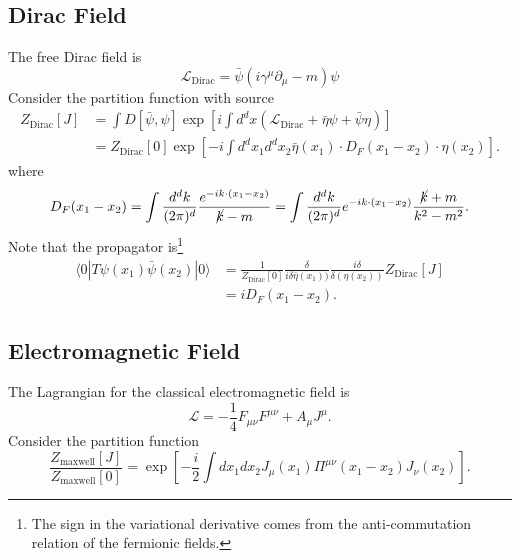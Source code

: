 \subsection{Dirac Field}
The free Dirac field is
\begin{equation}
	\mathcal{L}_{\mathrm{Dirac}}
	= \bar\psi \left(i\gamma^\mu \partial_\mu - m\right)\psi
\end{equation}
Consider the partition function with source
\begin{equation}
\begin{aligned}
	Z_{\mathrm{Dirac}}[J]
	&= \int D[\bar\psi,\psi] \exp\left[i\int d^dx \left(\mathcal{L}_{\mathrm{Dirac}}+\bar{\eta}\psi + \bar\psi\eta \right) \right] \\
	&= Z_{\mathrm{Dirac}}[0] \exp\left[-i\int d^dx_1 d^d x_2 \bar{\eta}(x_1)\cdot D_F(x_1-x_2)\cdot \eta(x_2) \right].
\end{aligned}
\end{equation}
where
\begin{equation}
	D_F(x_1-x_2) = \int \frac{d^d k}{(2\pi)^d} \frac{e^{-i k \cdot (x_1-x_2)}}{\cancel{k}-m}
	= \int \frac{d^d k}{(2\pi)^d} e^{-i k \cdot (x_1-x_2)} \frac{\cancel{k}+m}{k^2-m^2}.
\end{equation}
Note that the propagator is\footnote{The sign in the variational derivative comes from the anti-commutation relation of the fermionic fields.}
\begin{equation}
\begin{aligned}
	\langle 0| T \psi(x_1) \bar\psi(x_2) |0\rangle
	&= \frac{1}{Z_{\mathrm{Dirac}}[0]}\frac{\delta}{i\delta \bar{\eta}(x_1))}\frac{i\delta}{\delta(\eta(x_2))} Z_{\mathrm{Dirac}}[J] \\
	&= i D_F(x_1-x_2).
\end{aligned}
\end{equation}

\subsection{Electromagnetic Field}
The Lagrangian for the classical electromagnetic field is
\begin{equation}
	\mathcal{L} = -\frac{1}{4}F_{\mu\nu}F^{\mu\nu}+A_\mu J^\mu.
\end{equation}
Consider the partition function
\begin{equation}
	\frac{Z_{\mathrm{maxwell}}[J]}{Z_{\mathrm{maxwell}}[0]}
	= \exp\left[-\frac{i}{2}\int dx_1 dx_2 J_\mu(x_1) \Pi^{\mu\nu}(x_1-x_2) J_\nu(x_2) \right].
\end{equation}

